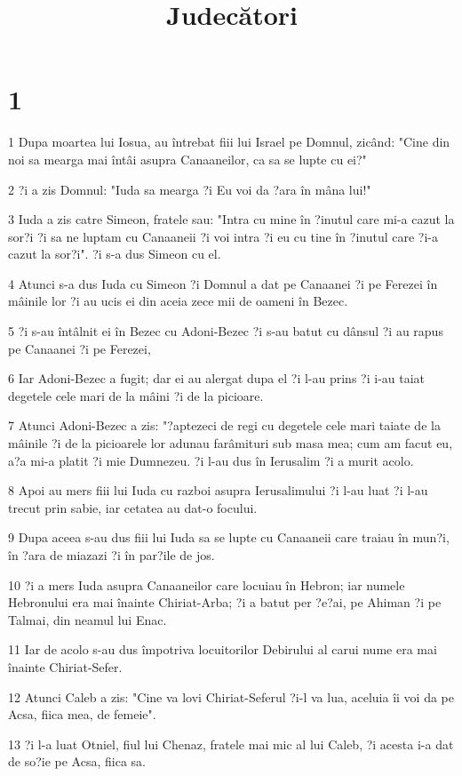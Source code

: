 

\title{Judecători}


\chapter{1}

\par 1 Dupa moartea lui Iosua, au întrebat fiii lui Israel pe Domnul, zicând: "Cine din noi sa mearga mai întâi asupra Canaaneilor, ca sa se lupte cu ei?"
\par 2 ?i a zis Domnul: "Iuda sa mearga ?i Eu voi da ?ara în mâna lui!"
\par 3 Iuda a zis catre Simeon, fratele sau: "Intra cu mine în ?inutul care mi-a cazut la sor?i ?i sa ne luptam cu Canaaneii ?i voi intra ?i eu cu tine în ?inutul care ?i-a cazut la sor?i". ?i s-a dus Simeon cu el.
\par 4 Atunci s-a dus Iuda cu Simeon ?i Domnul a dat pe Canaanei ?i pe Ferezei în mâinile lor ?i au ucis ei din aceia zece mii de oameni în Bezec.
\par 5 ?i s-au întâlnit ei în Bezec cu Adoni-Bezec ?i s-au batut cu dânsul ?i au rapus pe Canaanei ?i pe Ferezei,
\par 6 Iar Adoni-Bezec a fugit; dar ei au alergat dupa el ?i l-au prins ?i i-au taiat degetele cele mari de la mâini ?i de la picioare.
\par 7 Atunci Adoni-Bezec a zis: "?aptezeci de regi cu degetele cele mari taiate de la mâinile ?i de la picioarele lor adunau farâmituri sub masa mea; cum am facut eu, a?a mi-a platit ?i mie Dumnezeu. ?i l-au dus în Ierusalim ?i a murit acolo.
\par 8 Apoi au mers fiii lui Iuda cu razboi asupra Ierusalimului ?i l-au luat ?i l-au trecut prin sabie, iar cetatea au dat-o focului.
\par 9 Dupa aceea s-au dus fiii lui Iuda sa se lupte cu Canaaneii care traiau în mun?i, în ?ara de miazazi ?i în par?ile de jos.
\par 10 ?i a mers Iuda asupra Canaaneilor care locuiau în Hebron; iar numele Hebronului era mai înainte Chiriat-Arba; ?i a batut per ?e?ai, pe Ahiman ?i pe Talmai, din neamul lui Enac.
\par 11 Iar de acolo s-au dus împotriva locuitorilor Debirului al carui nume era mai înainte Chiriat-Sefer.
\par 12 Atunci Caleb a zis: "Cine va lovi Chiriat-Seferul ?i-l va lua, aceluia îi voi da pe Acsa, fiica mea, de femeie".
\par 13 ?i l-a luat Otniel, fiul lui Chenaz, fratele mai mic al lui Caleb, ?i acesta i-a dat de so?ie pe Acsa, fiica sa.
